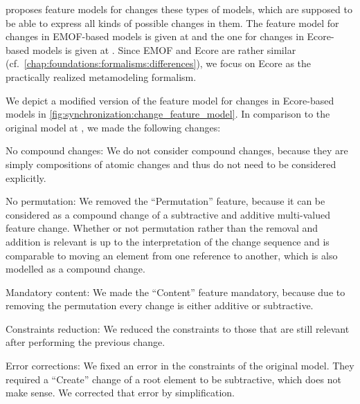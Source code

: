 \textcite{kramer2017a} proposes feature models for changes these types of models, which are supposed to be able to express all kinds of possible changes in them.
The feature model for changes in \gls{EMOF}-based models is given at \cite[Fig. 5.2]{kramer2017a} and the one for changes in Ecore-based models is given at \cite[Fig. 5.3]{kramer2017a}.
Since \gls{EMOF} and Ecore are rather similar (cf.~\autoref{chap:foundations:formalisms:differences}), we focus on Ecore as the practically realized metamodeling formalism.

We depict a modified version of the feature model for changes in Ecore-based models in \autoref{fig:synchronization:change_feature_model}.
In comparison to the original model at \cite[Fig. 5.3]{kramer2017a}, we made the following changes:
\begin{properdescription}
    \item[No compound changes:] We do not consider compound changes, because they are simply compositions of atomic changes and thus do not need to be considered explicitly.
    \item[No permutation:] We removed the \enquote{Permutation} feature, because it can be considered as a compound change of a subtractive and additive multi-valued feature change. Whether or not permutation rather than the removal and addition is relevant is up to the interpretation of the change sequence and is comparable to moving an element from one reference to another, which is also modelled as a compound change.
    \item[Mandatory content:] We made the \enquote{Content} feature mandatory, because due to removing the permutation every change is either additive or subtractive.
    \item[Constraints reduction:] We reduced the constraints to those that are still relevant after performing the previous change.
    \item[Error corrections:] We fixed an error in the constraints of the original model. They required a \enquote{Create} change of a root element to be subtractive, which does not make sense. We corrected that error by simplification.
\end{properdescription}


